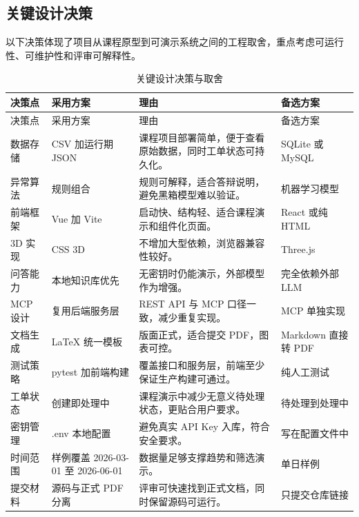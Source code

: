 \documentclass[12pt,a4paper]{ctexart}
\begin{document}
\subsection{关键设计决策}
以下决策体现了项目从课程原型到可演示系统之间的工程取舍，重点考虑可运行性、可维护性和评审可解释性。
\begin{longtable}{L{3.2cm}L{4.3cm}L{4.8cm}L{3.0cm}}
\caption{关键设计决策与取舍}\\
\toprule
决策点 & 采用方案 & 理由 & 备选方案 \\
\midrule
\endfirsthead
\toprule
决策点 & 采用方案 & 理由 & 备选方案 \\
\midrule
\endhead
数据存储 & CSV 加运行期 JSON & 课程项目部署简单，便于查看原始数据，同时工单状态可持久化。 & SQLite 或 MySQL \\
异常算法 & 规则组合 & 规则可解释，适合答辩说明，避免黑箱模型难以验证。 & 机器学习模型 \\
前端框架 & Vue 加 Vite & 启动快、结构轻、适合课程演示和组件化页面。 & React 或纯 HTML \\
3D 实现 & CSS 3D & 不增加大型依赖，浏览器兼容性较好。 & Three.js \\
问答能力 & 本地知识库优先 & 无密钥时仍能演示，外部模型作为增强。 & 完全依赖外部 LLM \\
MCP 设计 & 复用后端服务层 & REST API 与 MCP 口径一致，减少重复实现。 & MCP 单独实现 \\
文档生成 & LaTeX 统一模板 & 版面正式，适合提交 PDF，图表可控。 & Markdown 直接转 PDF \\
测试策略 & pytest 加前端构建 & 覆盖接口和服务层，前端至少保证生产构建可通过。 & 纯人工测试 \\
工单状态 & 创建即处理中 & 课程演示中减少无意义待处理状态，更贴合用户要求。 & 待处理到处理中 \\
密钥管理 & .env 本地配置 & 避免真实 API Key 入库，符合安全要求。 & 写在配置文件中 \\
时间范围 & 样例覆盖 2026-03-01 至 2026-06-01 & 数据量足够支撑趋势和筛选演示。 & 单日样例 \\
提交材料 & 源码与正式 PDF 分离 & 评审可快速找到正式文档，同时保留源码可运行。 & 只提交仓库链接 \\
\bottomrule
\end{longtable}
\end{document}
